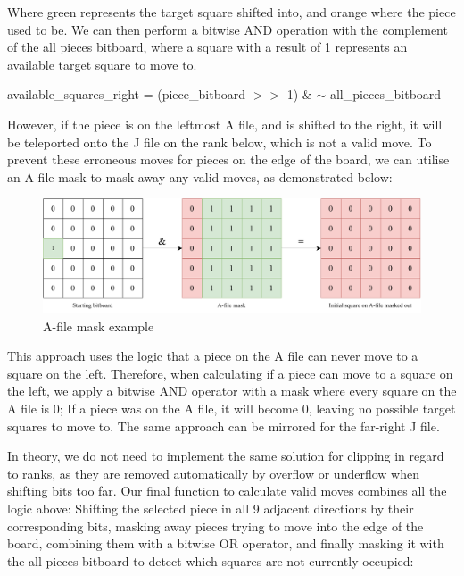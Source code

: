 \documentclass[../main/main.tex]{subfiles}
\begin{document}
Where green represents the target square shifted into, and orange where the piece used to be. We can then perform a bitwise AND operation with the complement of the all pieces bitboard, where a square with a result of 1 represents an available target square to move to.

\begin{center}
available\_squares\_right = (piece\_bitboard $>>$ 1) \& $\sim$ all\_pieces\_bitboard
\end{center}

However, if the piece is on the leftmost A file, and is shifted to the right, it will be teleported onto the J file on the rank below, which is not a valid move. To prevent these erroneous moves for pieces on the edge of the board, we can utilise an A file mask to mask away any valid moves, as demonstrated below:

\begin{figure}[H]
    \centering
    \includegraphics[width=\columnwidth]{../design/assets/bitboard_masked.pdf}
    \caption{A-file mask example}
    \label{fig:bitboard-masked}
\end{figure}

This approach uses the logic that a piece on the A file can never move to a square on the left. Therefore, when calculating if a piece can move to a square on the left, we apply a bitwise AND operator with a mask where every square on the A file is 0; If a piece was on the A file, it will become 0, leaving no possible target squares to move to. The same approach can be mirrored for the far-right J file.

In theory, we do not need to implement the same solution for clipping in regard to ranks, as they are removed automatically by overflow or underflow when shifting bits too far.
Our final function to calculate valid moves combines all the logic above: Shifting the selected piece in all 9 adjacent directions by their corresponding bits, masking away pieces trying to move into the edge of the board, combining them with a bitwise OR operator, and finally masking it with the all pieces bitboard to detect which squares are not currently occupied:
\end{document}
